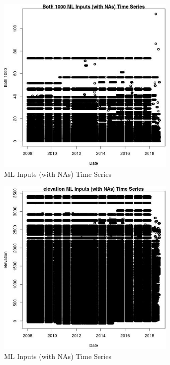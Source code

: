 \begin{figure} 
\centering  
\includegraphics[width=0.77\textwidth]{Code_Outputs/Report_ML_input_PM25_Step4_part_e_de_duplicated_aves_compiled_2019-05-20wNAs_Both_1000vDate.jpg} 
\caption{\label{fig:Report_ML_input_PM25_Step4_part_e_de_duplicated_aves_compiled_2019-05-20wNAsBoth_1000vDate}ML Inputs (with NAs) Time Series} 
\end{figure} 
 

\begin{figure} 
\centering  
\includegraphics[width=0.77\textwidth]{Code_Outputs/Report_ML_input_PM25_Step4_part_e_de_duplicated_aves_compiled_2019-05-20wNAs_elevationvDate.jpg} 
\caption{\label{fig:Report_ML_input_PM25_Step4_part_e_de_duplicated_aves_compiled_2019-05-20wNAselevationvDate}ML Inputs (with NAs) Time Series} 
\end{figure} 
 

